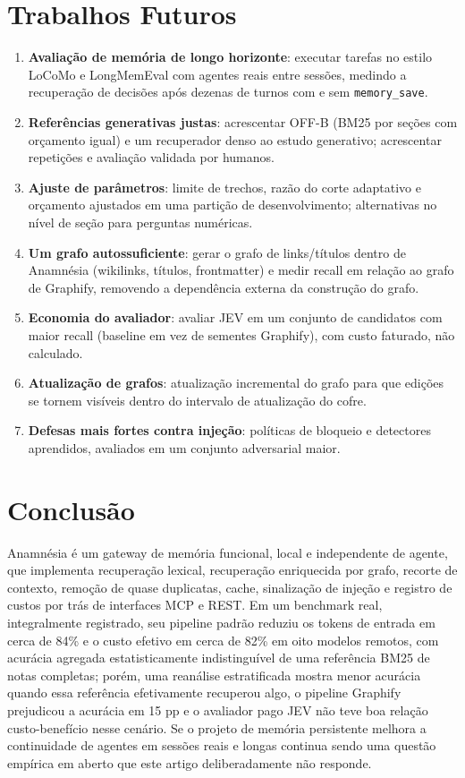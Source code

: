 \documentclass[conference,onecolumn,11pt]{IEEEtran}
\newcommand{\anam}{Anam\-n\'esia}
\begin{document}
\section{Trabalhos Futuros}\label{sec:future}
\begin{enumerate}
\item \textbf{Avaliação de memória de longo horizonte}: executar tarefas no estilo LoCoMo e LongMemEval \cite{maharana2024locomo,wu2025longmemeval} com agentes reais entre sessões, medindo a recuperação de decisões após dezenas de turnos com e sem \texttt{memory\_save}.
\item \textbf{Referências generativas justas}: acrescentar OFF-B (BM25 por seções com orçamento igual) e um recuperador denso ao estudo generativo; acrescentar repetições e avaliação validada por humanos.
\item \textbf{Ajuste de parâmetros}: limite de trechos, razão do corte adaptativo e orçamento ajustados em uma partição de desenvolvimento; alternativas no nível de seção para perguntas numéricas.
\item \textbf{Um grafo autossuficiente}: gerar o grafo de links/títulos dentro de \anam{} (wikilinks, títulos, frontmatter) e medir recall em relação ao grafo de Graphify, removendo a dependência externa da construção do grafo.
\item \textbf{Economia do avaliador}: avaliar JEV em um conjunto de candidatos com maior recall (baseline em vez de sementes Graphify), com custo faturado, não calculado.
\item \textbf{Atualização de grafos}: atualização incremental do grafo para que edições se tornem visíveis dentro do intervalo de atualização do cofre.
\item \textbf{Defesas mais fortes contra injeção}: políticas de bloqueio e detectores aprendidos, avaliados em um conjunto adversarial maior.
\end{enumerate}

\section{Conclusão}
\anam{} é um gateway de memória funcional, local e independente de agente, que implementa recuperação lexical, recuperação enriquecida por grafo, recorte de contexto, remoção de quase duplicatas, cache, sinalização de injeção e registro de custos por trás de interfaces MCP e REST. Em um benchmark real, integralmente registrado, seu pipeline padrão reduziu os tokens de entrada em cerca de 84\% e o custo efetivo em cerca de 82\% em oito modelos remotos, com acurácia agregada estatisticamente indistinguível de uma referência BM25 de notas completas; porém, uma reanálise estratificada mostra menor acurácia quando essa referência efetivamente recuperou algo, o pipeline Graphify prejudicou a acurácia em 15 pp e o avaliador pago JEV não teve boa relação custo-benefício nesse cenário. Se o projeto de memória persistente melhora a continuidade de agentes em sessões reais e longas continua sendo uma questão empírica em aberto que este artigo deliberadamente não responde.
\end{document}
